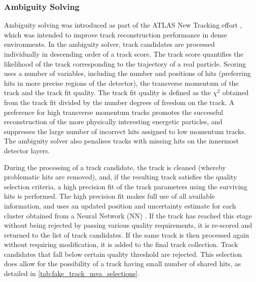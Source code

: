 \subsubsection{Ambiguity Solving}
Ambiguity solving was introduced as part of the ATLAS New Tracking effort \cite{Cornelissen:2007vba}, which was intended to improve track reconstruction performance in dense environments.
In the ambiguity solver, track candidates are processed individually in descending order of a track score. The track score quantifies the likelihood of the track corresponding to the trajectory of a real particle. Scoring uses a number of variables, including the number and positions of hits (preferring hits in more precise regions of the detector), the transverse momentum of the track and the track fit quality. The track fit quality is defined as the $\chi^2$ obtained from the track fit divided by the number degrees of freedom on the track. A preference for high transverse momentum tracks promotes the successful reconstruction of the more physically interesting energetic particles, and suppresses the large number of incorrect hits assigned to low momentum tracks.
The ambiguity solver also penalises tracks with missing hits on the innermost detector layers. 

During the processing of a track candidate, the track is cleaned (whereby problematic hits are removed), and, if the resulting track satisfies the quality selection criteria, a high precision fit of the track parameters using the surviving hits is performed.
The high precision fit makes full use of all available information, and uses an updated position and uncertainty estimate for each cluster obtained from a Neural Network (NN) \cite{PERF-2012-05}.
If the track has reached this stage without being rejected by passing various quality requirements, it is re-scored and returned to the list of track candidates.
If the same track is then processed again without requiring modification, it is added to the final track collection.
Track candidates that fall below certain quality threshold are rejected.
This selection does allow for the possibility of a track having small number of shared hits, as detailed in \cref{tab:fake_track_mva_selections}.

